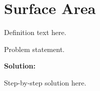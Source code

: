 \section{Surface Area}


\begin{definition}[Term]
Definition text here.
\end{definition}

\begin{example}
Problem statement.

\textbf{Solution:}

Step-by-step solution here.
\end{example}
